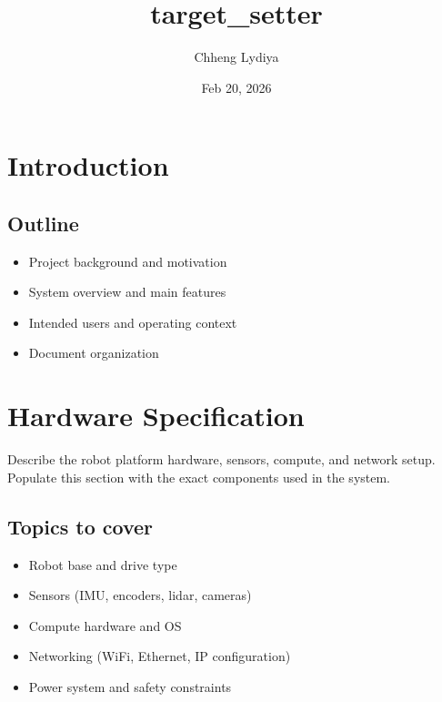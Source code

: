 \documentclass[letterpaper,10pt,english]{sphinxmanual}
\title{target\_setter}
\date{Feb 20, 2026}
\author{Chheng Lydiya}
\begin{document}
\pagestyle{empty}
\sphinxmaketitle
\pagestyle{plain}
\sphinxtableofcontents
\pagestyle{normal}
\label{\detokenize{index::doc}}



\chapter{Introduction}
\label{\detokenize{introduction:introduction}}\label{\detokenize{introduction::doc}}

\section{Outline}
\label{\detokenize{introduction:outline}}\begin{itemize}
\item {} 
\sphinxAtStartPar
Project background and motivation

\item {} 
\sphinxAtStartPar
System overview and main features

\item {} 
\sphinxAtStartPar
Intended users and operating context

\item {} 
\sphinxAtStartPar
Document organization

\end{itemize}


\chapter{Hardware Specification}
\label{\detokenize{hardware_specification:hardware-specification}}\label{\detokenize{hardware_specification::doc}}
\sphinxAtStartPar
Describe the robot platform hardware, sensors, compute, and network setup.
Populate this section with the exact components used in the system.


\section{Topics to cover}
\label{\detokenize{hardware_specification:topics-to-cover}}\begin{itemize}
\item {} 
\sphinxAtStartPar
Robot base and drive type

\item {} 
\sphinxAtStartPar
Sensors (IMU, encoders, lidar, cameras)

\item {} 
\sphinxAtStartPar
Compute hardware and OS

\item {} 
\sphinxAtStartPar
Networking (Wi\sphinxhyphen{}Fi, Ethernet, IP configuration)

\item {} 
\sphinxAtStartPar
Power system and safety constraints

\end{itemize}
\end{document}
